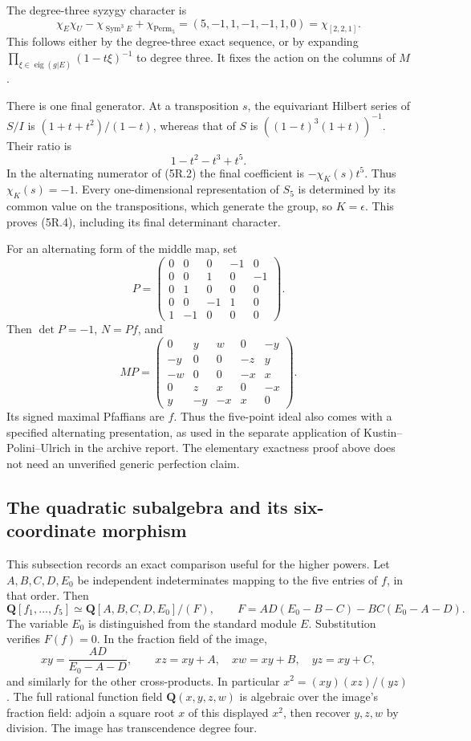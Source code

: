 \documentclass[
  10pt,
]{article}
\begin{document}
The degree-three syzygy character is \[
\chi_E\chi_U-\chi_{\operatorname{Sym}^3E}
 +\chi_{\operatorname{Perm}_5}
=(5,-1,1,-1,-1,1,0)=\chi_{[2,2,1]}.
\tag{5R.12}
\] This follows either by the degree-three exact sequence, or by
expanding \(\prod_{\xi\in\operatorname{eig}(g|E)}(1-t\xi)^{-1}\) to
degree three. It fixes the action on the columns of \(M\).

There is one final generator. At a transposition \(s\), the equivariant
Hilbert series of \(S/I\) is \((1+t+t^2)/(1-t)\), whereas that of \(S\)
is \(((1-t)^3(1+t))^{-1}\). Their ratio is \[
1-t^2-t^3+t^5.
\tag{5R.13}
\] In the alternating numerator of (5R.2) the final coefficient is
\(-\chi_K(s)t^5\). Thus \(\chi_K(s)=-1\). Every one-dimensional
representation of \(S_5\) is determined by its common value on the
transpositions, which generate the group, so \(K=\epsilon\). This proves
(5R.4), including its final determinant character.

For an alternating form of the middle map, set \[
P=\begin{pmatrix}
0&0&0&-1&0\\0&0&1&0&-1\\0&1&0&0&0\\
0&0&-1&1&0\\1&-1&0&0&0
\end{pmatrix}.
\] Then \(\det P=-1\), \(N=Pf\), and \[
MP=\begin{pmatrix}
0&y&w&0&-y\\-y&0&0&-z&y\\-w&0&0&-x&x\\
0&z&x&0&-x\\y&-y&-x&x&0
\end{pmatrix}.
\tag{5R.14}
\] Its signed maximal Pfaffians are \(f\). Thus the five-point ideal
also comes with a specified alternating presentation, as used in the
separate application of Kustin--Polini--Ulrich in the archive report.
The elementary exactness proof above does not need an unverified generic
perfection claim.

\subsection{The quadratic subalgebra and its six-coordinate
morphism}\label{the-quadratic-subalgebra-and-its-six-coordinate-morphism}

This subsection records an exact comparison useful for the higher
powers. Let \(A,B,C,D,E_0\) be independent indeterminates mapping to the
five entries of \(f\), in that order. Then \[
\boxed{\mathbf Q[f_1,\ldots,f_5]
\simeq\mathbf Q[A,B,C,D,E_0]/(F),\qquad
F=AD(E_0-B-C)-BC(E_0-A-D).}
\tag{5R.15}
\] The variable \(E_0\) is distinguished from the standard module \(E\).
Substitution verifies \(F(f)=0\). In the fraction field of the image, \[
xy=\frac{AD}{E_0-A-D},\qquad
xz=xy+A,\quad xw=xy+B,\quad yz=xy+C,
\tag{5R.16}
\] and similarly for the other cross-products. In particular
\(x^2=(xy)(xz)/(yz)\). The full rational function field
\(\mathbf Q(x,y,z,w)\) is algebraic over the image's fraction field:
adjoin a square root \(x\) of this displayed \(x^2\), then recover
\(y,z,w\) by division. The image has transcendence degree four.
\end{document}

